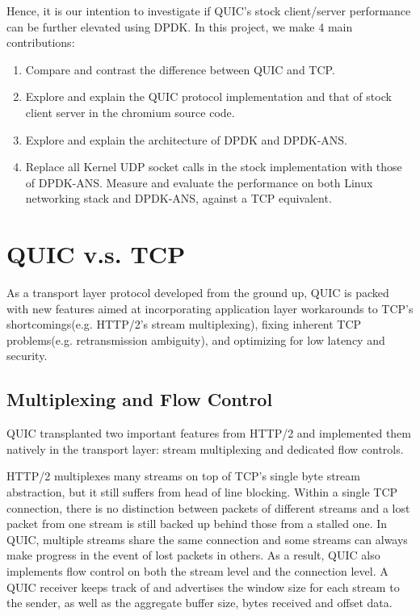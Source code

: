 \documentclass{sig-alternate-05-2015}
\begin{document}
Hence, it is our intention to investigate if QUIC's stock client/server performance can be further elevated using DPDK. In this project, we make 4 main contributions:

\begin{enumerate}
	\itemsep0em
	\item Compare and contrast the difference between QUIC and TCP.
	\item Explore and explain the QUIC protocol implementation and that of stock client server in the chromium source code.
	\item Explore and explain the architecture of DPDK and DPDK-ANS.
	\item Replace all Kernel UDP socket calls in the stock implementation with those of DPDK-ANS. Measure and evaluate the performance on both Linux networking stack and DPDK-ANS, against a TCP equivalent.
\end{enumerate}

\section{QUIC v.s. TCP}
As a transport layer protocol developed from the ground up, QUIC is packed with new features aimed at incorporating application layer workarounds to TCP's shortcomings(e.g. HTTP/2's stream multiplexing), fixing inherent TCP problems(e.g. retransmission ambiguity), and optimizing for low latency and security.

\subsection{Multiplexing and Flow Control}
QUIC transplanted two important features from HTTP/2 and implemented them natively in the transport layer: stream multiplexing and dedicated flow controls.

HTTP/2 multiplexes many streams on top of TCP's single byte stream abstraction, but it still suffers from head of line blocking. Within a single TCP connection, there is no distinction between packets of different streams and a lost packet from one stream is still backed up behind those from a stalled one. In QUIC, multiple streams share the same connection and some streams can always make progress in the event of lost packets in others. As a result, QUIC also implements flow control on both the stream level and the connection level. A QUIC receiver keeps track of and advertises the window size for each stream to the sender, as well as the aggregate buffer size, bytes received and offset data. \cite{quic:draft}
\end{document}
